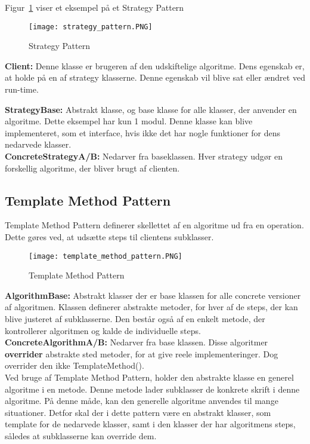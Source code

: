 \documentclass[../SWD_disp.tex]{subfiles}
\begin{document}
Figur~\ref{fig:strategy_pattern} viser et eksempel på et Strategy Pattern

\begin{figure}[H]
	\centering
	\texttt{[image: strategy\_pattern.PNG]}
	\caption{Strategy Pattern}
	\label{fig:strategy_pattern}
\end{figure}

\textbf{Client:} Denne klasse er brugeren af den udskiftelige algoritme. Dens egenskab er, at holde på en af strategy klasserne. Denne egenskab vil blive sat eller ændret ved run-time.

\textbf{StrategyBase:} Abstrakt klasse, og base klasse for alle klasser, der anvender en algoritme. Dette eksempel har kun 1 modul. Denne klasse kan blive implementeret, som et interface, hvis ikke det har nogle funktioner for dens nedarvede klasser.
\\

\textbf{ConcreteStrategyA/B:} Nedarver fra baseklassen. Hver strategy udgør en forskellig algoritme, der bliver brugt af clienten.

\subsection*{Template Method Pattern}
Template Method Pattern definerer skellettet af en algoritme ud fra en operation. Dette gøres ved, at udsætte steps til clientens subklasser.

\begin{figure}[H]
	\centering
	\texttt{[image: template\_method\_pattern.PNG]}
	\caption{Template Method Pattern}
	\label{fig:template_method_pattern}
\end{figure}

\textbf{AlgorithmBase:} Abstrakt klasser der er base klassen for alle concrete versioner af algoritmen. Klassen definerer abstrakte metoder, for hver af de steps, der kan blive justeret af subklasserne. Den består også af en enkelt metode, der kontrollerer algoritmen og kalde de individuelle steps.
\\

\textbf{ConcreteAlgorithmA/B:} Nedarver fra base klassen. Disse algoritmer \textbf{overrider} abstrakte sted metoder, for at give reele implementeringer. Dog overrider den ikke TemplateMethod().
\\

Ved bruge af Template Method Pattern, holder den abstrakte klasse en generel algoritme i en metode. Denne metode lader subklasser de konkrete skrift i denne algoritme. På denne måde, kan den generelle algoritme anvendes til mange situationer. Detfor skal der i dette pattern være en abstrakt klasser, som template for de nedarvede klasser, samt i den klasser der har algoritmens steps, således at subklasserne kan override dem.
\end{document}
